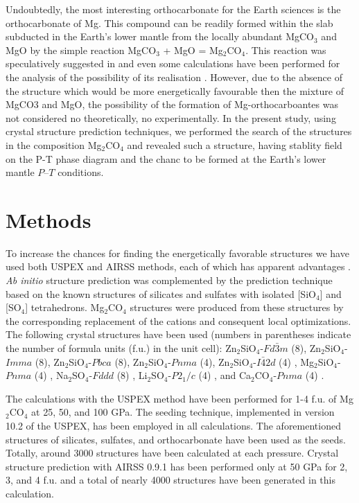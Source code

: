 \documentclass[a4paperm]{article}
\begin{document}
Undoubtedly, the most interesting orthocarbonate for the Earth sciences is the orthocarbonate of Mg. 
This compound can be readily formed within the slab subducted in the Earth's lower mantle from the locally abundant MgCO$_3$ and MgO by the simple reaction MgCO$_3$ + MgO = Mg$_2$CO$_4$.
This reaction was speculatively suggested in \cite{katsura1991_mgco3} and even some calculations have been performed for the analysis of the possibility of its realisation \cite{sugano1980}.
However, due to the absence of the structure which would be more energetically favourable then the mixture of MgCO3 and MgO, the possibility of the formation of Mg-orthocarboantes was not considered no theoretically, no experimentally.
In the present study, using crystal structure prediction techniques, we performed the search of the structures in the composition Mg$_2$CO$_4$ and revealed such a structure, having stablity field on the P-T phase diagram and the chanc to be formed at the Earth's lower mantle $P$--$T$ conditions.


		\section*{Methods}

To increase the chances for finding the energetically favorable structures we have used both USPEX and AIRSS methods, each of which has apparent advantages \cite{oganov2019}.
{\it Ab initio} structure prediction was complemented by the prediction technique based on the known structures of silicates and sulfates with isolated [SiO$_4$] and [SO$_4$] tetrahedrons. 
Mg$_2$CO$_4$ structures were produced from these structures by the corresponding replacement of the cations and consequent local optimizations.
The following crystal structures have been used (numbers in parentheses indicate the number of formula units (f.u.) in the unit cell): Zn$_2$SiO$_4$-$Fd\bar{3}m$ (8), Zn$_2$SiO$_4$-$Imma$ (8), Zn$_2$SiO$_4$-$Pbca$ (8), Zn$_2$SiO$_4$-$Pnma$ (4), Zn$_2$SiO$_4$-$I\bar{4}2d$ (4) \cite{kanzaki2019}, Mg$_2$SiO$_4$-$Pnma$ (4) \cite{smyth1973}, Na$_2$SO$_4$-$Fddd$ (8) \cite{hawthorne1975}, Li$_2$SO$_4$-$P2_1/c$ (4) \cite{alcock1973}, and Ca$_2$CO$_4$-$Pnma$ (4) \cite{sagatova2020_ortho}.
 
The calculations with the USPEX method \cite{uspex1,uspex2,uspex3,uspex_topology} have been performed for 1-4 f.u. of Mg$_2$CO$_4$ at 25, 50, and 100 GPa.
The seeding technique, implemented in version 10.2 of the USPEX, has been employed in all calculations.
The aforementioned structures of silicates, sulfates, and orthocarbonate have been used as the seeds.
Totally, around 3000 structures have been calculated at each pressure.
Crystal structure prediction with AIRSS 0.9.1 \cite{airss1,airss2} has been performed only at 50 GPa for 2, 3, and 4 f.u. and a total of nearly 4000 structures have been generated in this calculation.
\end{document}
